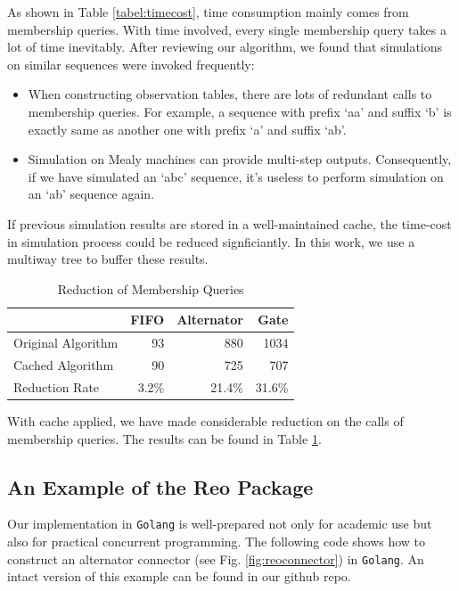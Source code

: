 \documentclass[conference, a4paper]{IEEEtran}
\begin{document}
As shown in Table \ref{tabel:timecost}, time consumption mainly comes from membership queries.
With time involved, every single membership query takes a lot of time inevitably.
After reviewing our algorithm, we found that simulations on similar sequences were invoked frequently:

\begin{itemize}
  \item When constructing observation tables, there are lots of redundant calls to membership
    queries. For example, a sequence with prefix `aa' and suffix `b' is exactly same as another one
    with prefix `a' and suffix `ab'.
  \item Simulation on Mealy machines can provide multi-step outputs.  Consequently, if we have
    simulated an `abc' sequence, it's useless to perform simulation on an `ab' sequence again.
\end{itemize}

If previous simulation results are stored in a well-maintained cache, the time-cost in
simulation process could be reduced signficiantly. In this work, we use a multiway tree to buffer
these results.

\begin{table}[ht]
  \renewcommand{\arraystretch}{1.3}
  \caption{Reduction of Membership Queries}
  \label{tabel:cacheoptimization}
  \centering
  \begin{tabular}{l||rrr}
    \hline
    & FIFO & Alternator & Gate \\
    \hline\hline
    Original Algorithm & 93 & 880 & 1034 \\
    Cached Algorithm & 90 & 725 & 707 \\
    Reduction Rate & 3.2\% & 21.4\% & 31.6\% \\
    \hline
  \end{tabular}
\end{table}

With cache applied, we have made considerable reduction on the calls of membership queries. The results
can be found in Table \ref{tabel:cacheoptimization}.

\subsection{An Example of the Reo Package }
\label{sec:reolib}

Our implementation in \texttt{Golang} is well-prepared not only for academic use
but also for practical concurrent programming. The following code shows how to construct an alternator
connector (see Fig. \ref{fig:reoconnector}) in \texttt{Golang}. An intact version of this example
can be found in our github repo.
\end{document}
